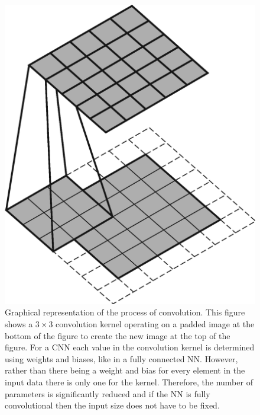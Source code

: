             \begin{figure}
                \centering
                
                \includegraphics[width=1.0\linewidth]{figures/background_cnn.png}
                
                \captionsetup{singlelinecheck=false}
                \caption{
                    Graphical representation of the process of convolution. This figure shows a $3\times3$ convolution kernel operating on a padded image at the bottom of the figure to create the new image at the top of the figure. For a \gls{CNN} each value in the convolution kernel is determined using weights and biases, like in a fully connected \gls{NN}. However, rather than there being a weight and bias for every element in the input data there is only one for the kernel. Therefore, the number of parameters is significantly reduced and if the \gls{NN} is fully convolutional then the input size does not have to be fixed.
                }
                \label{sec:pseudo_bayesian_dip_denoising_as_a_preprocessing_step_for_kinetic_modelling_in_dynamic_pet_appendix_methods_network_design_and_execution_cnn}
            \end{figure}
            
